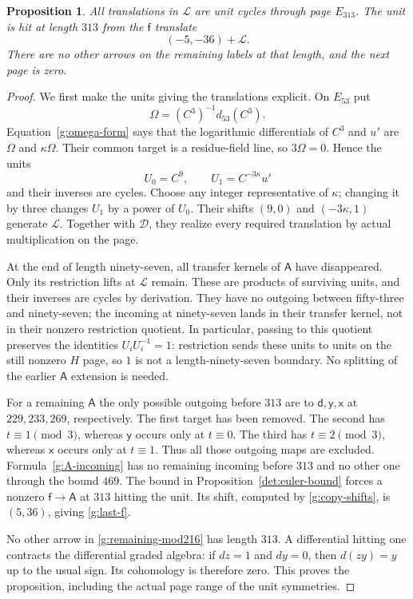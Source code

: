 \documentclass[11pt]{article}
\newtheorem{proposition}[theorem]{Proposition}
\theoremstyle{definition}
\theoremstyle{remark}
\numberwithin{equation}{section}
\begin{document}
\begin{proposition}\label{g:unit313}
All translations in $\mathcal L$ are unit cycles through
page $E_{313}$.  The unit is hit at length $313$ from
the $\mathsf f$ translate
\begin{equation}\label{g:last-f}
 (-5,-36)+\mathcal L.
\end{equation}
There are no other arrows on the remaining labels at
that length, and the next page is zero.
\end{proposition}

\begin{proof}
We first make the units giving the translations explicit.
On $E_{53}$ put
\[
 \Omega=(C^3)^{-1}d_{53}(C^3).
\]
Equation~\eqref{g:omega-form} says that the logarithmic
differentials of $C^3$ and $u'$ are $\Omega$ and
$\kappa\Omega$.  Their common target is a
residue-field line, so $3\Omega=0$.  Hence the units
\begin{equation}\label{g:lattice-generators}
 U_0=C^9,\qquad U_1=C^{-3\kappa}u'
\end{equation}
and their inverses are cycles.  Choose any integer
representative of $\kappa$; changing it by three
changes $U_1$ by a power of $U_0$.
Their shifts $(9,0)$ and $(-3\kappa,1)$ generate
$\mathcal L$.  Together with $\mathcal D$, they
realize every required translation by actual
multiplication on the page.

At the end of length ninety-seven, all transfer
kernels of $\mathsf A$ have disappeared.  Only its
restriction lifts at $\mathcal L$ remain.  These
are products of surviving units, and their inverses
are cycles by derivation.  They have no outgoing
between fifty-three and ninety-seven; the incoming
at ninety-seven lands in their transfer kernel,
not in their nonzero restriction quotient.
In particular, passing to this quotient preserves
the identities $U_iU_i^{-1}=1$: restriction sends
these units to units on the still nonzero $H$ page,
so $1$ is not a length-ninety-seven boundary.
No splitting of the earlier $\mathsf A$ extension
is needed.

For a remaining $\mathsf A$ the only possible
outgoing before $313$ are to $\mathsf d,\mathsf y,
\mathsf x$ at $229,233,269$, respectively.  The
first target has been removed.  The second has
$t\equiv1\pmod3$, whereas $\mathsf y$ occurs
only at $t\equiv0$.  The third has
$t\equiv2\pmod3$, whereas $\mathsf x$ occurs
only at $t\equiv1$.  Thus all those outgoing
maps are excluded.  Formula~\eqref{g:A-incoming}
has no remaining incoming before $313$ and no
other one through the bound $469$.  The bound in
Proposition~\ref{det:euler-bound} forces a nonzero
$\mathsf f\to\mathsf A$ at $313$ hitting the
unit.  Its shift, computed by
\eqref{g:copy-shifts}, is $(5,36)$, giving
\eqref{g:last-f}.

No other arrow in \eqref{g:remaining-mod216}
has length $313$.  A differential hitting one
contracts the differential graded algebra:
if $dz=1$ and $dy=0$, then $d(zy)=y$ up to the
usual sign.  Its cohomology is therefore zero.
This proves the proposition, including the actual
page range of the unit symmetries.
\end{proof}
\end{document}
